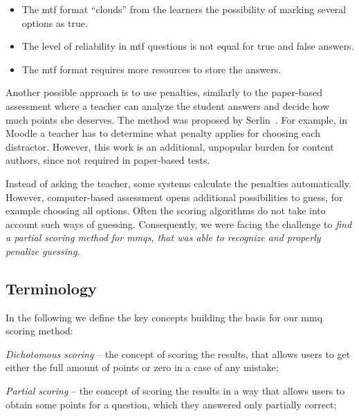 \documentclass[PhD, Submit, ngerman,UKenglish,table]{scrbook}
\begin{document}
\begin{itemize}
	\item The \gls{mtf} format ``clouds'' from the learners the possibility of marking several options as true.
	\item The level of reliability in \gls{mtf} questions is not equal for true and false answers.
	\item The \gls{mtf} format requires more resources to store the answers.
\end{itemize}

Another possible approach is to use penalties, similarly to the paper-based assessment where a teacher can analyze the student answers and decide how much points she deserves.
The method was proposed by Serlin~\cite{Serlin1978}.
For example, in Moodle a teacher has to determine what penalty applies for choosing each distractor.
However, this work is an additional, unpopular burden for content authors, since not required in paper-based tests.

Instead of asking the teacher, some systems calculate the penalties automatically. 
However, computer-based assessment opens additional possibilities to guess, for example choosing all options.
Often the scoring algorithms do not take into account such ways of guessing.
Consequently, we were facing the challenge to \textit{find a partial scoring method for \gls{mmq}s, that was able to recognize and properly penalize guessing}.

\subsection{Terminology} %
\label{sec:termin}

In the following we define the key concepts building the basis for our \gls{mmq} scoring method:

\textit{Dichotomous scoring} -- the concept of scoring the results, that allows users to get either the full amount of points or zero in a case of any mistake;

\textit{Partial scoring} -- the concept of scoring the results in a way that allows users to obtain some points for a question, which they answered only partially correct;
\end{document}
